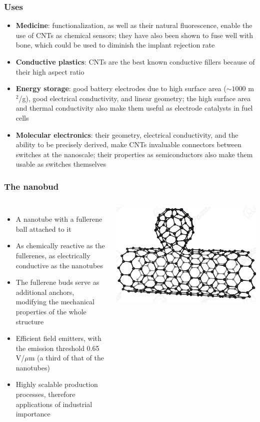 \documentclass{beamer}
\begin{document}
\begin{frame}
	\frametitle{Uses}
	\begin{itemize}
	\item \textbf{Medicine}: functionalization, as well as their natural fluorescence, enable the use of CNTs as chemical sensors; they have also been shown to fuse well with bone, which could be used to diminish the implant rejection rate
	\item \textbf{Conductive plastics}: CNTs are the best known conductive fillers because of their high aspect ratio
	\item \textbf{Energy storage}: good battery electrodes due to high surface area ($\sim 1000$ m$^2$/g), good electrical conductivity, and linear geometry; the high surface area and thermal conductivity also make them useful as electrode catalysts in fuel cells
	\item \textbf{Molecular electronics}: their geometry, electrical conductivity, and the ability to be precisely derived, make CNTs invaluable connectors between switches at the nanoscale; their properties as semiconductors also make them usable as switches themselves
	\end{itemize}
\end{frame}

\begin{frame}
	\frametitle{The nanobud}
	\begin{columns}
		\begin{itemize}
			\item A nanotube with a fullerene ball attached to it
			\item As chemically reactive as the fullerenes, as electrically conductive as the nanotubes
			\item The fullerene buds serve as additional anchors, modifying the mechanical properties of the whole structure
			\item Efficient field emitters, with the emission threshold 0.65 V/$\mu$m (a third of that of the nanotubes)
			\item Highly scalable production processes, therefore applications of industrial importance
		\end{itemize}
			\includegraphics[scale=.15]{Nanobud}
	\end{columns}
\end{frame}
\end{document}
